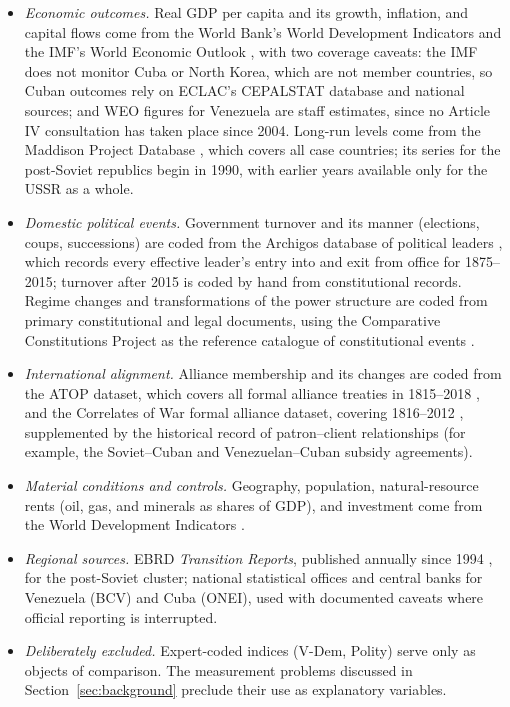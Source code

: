 \documentclass[11pt]{article}
\begin{document}
\begin{itemize}
    \item \emph{Economic outcomes.} Real GDP per capita and its growth, inflation, and capital flows come from the World Bank's World Development Indicators \parencite{worldbank_wdi} and the IMF's World Economic Outlook \parencite{imf_weo}, with two coverage caveats: the IMF does not monitor Cuba or North Korea, which are not member countries, so Cuban outcomes rely on ECLAC's CEPALSTAT database \parencite{eclac_cepalstat} and national sources; and WEO figures for Venezuela are staff estimates, since no Article IV consultation has taken place since 2004. Long-run levels come from the Maddison Project Database \parencite{bolt_vanzanden_2024}, which covers all case countries; its series for the post-Soviet republics begin in 1990, with earlier years available only for the USSR as a whole.
    \item \emph{Domestic political events.} Government turnover and its manner (elections, coups, successions) are coded from the Archigos database of political leaders \parencite{goemans_gleditsch_chiozza_2009}, which records every effective leader's entry into and exit from office for 1875--2015; turnover after 2015 is coded by hand from constitutional records. Regime changes and transformations of the power structure are coded from primary constitutional and legal documents, using the Comparative Constitutions Project as the reference catalogue of constitutional events \parencite{elkins_ginsburg_melton_2009}.
    \item \emph{International alignment.} Alliance membership and its changes are coded from the ATOP dataset, which covers all formal alliance treaties in 1815--2018 \parencite{leeds_etal_2002}, and the Correlates of War formal alliance dataset, covering 1816--2012 \parencite{gibler_sarkees_2004}, supplemented by the historical record of patron--client relationships (for example, the Soviet--Cuban and Venezuelan--Cuban subsidy agreements).
    \item \emph{Material conditions and controls.} Geography, population, natural-resource rents (oil, gas, and minerals as shares of GDP), and investment come from the World Development Indicators \parencite{worldbank_wdi}.
    \item \emph{Regional sources.} EBRD \emph{Transition Reports}, published annually since 1994 \parencite{ebrd_transition}, for the post-Soviet cluster; national statistical offices and central banks for Venezuela (BCV) and Cuba (ONEI), used with documented caveats where official reporting is interrupted.
    \item \emph{Deliberately excluded.} Expert-coded indices (V-Dem, Polity) serve only as objects of comparison. The measurement problems discussed in Section~\ref{sec:background} preclude their use as explanatory variables.
\end{itemize}
\end{document}
